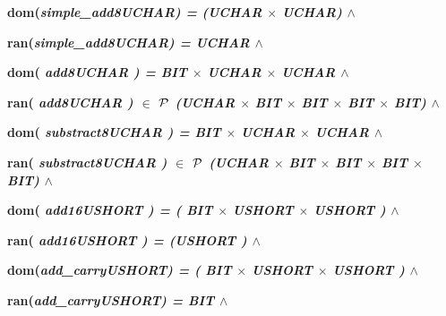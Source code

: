 \documentclass[11pt]{article}
\begin{document}
\begin{sloppypar}
\hspace*{0.20in}\bf dom\rm (\it simple\_add8UCHAR\rm ) \rm = \rm (\it UCHAR  $\times$  \it UCHAR\rm )  $\land$ 

\hspace*{0.20in}\bf ran\rm (\it simple\_add8UCHAR\rm ) \rm = \it UCHAR  $\land$ 

\hspace*{0.20in}

\hspace*{0.20in}

\hspace*{0.20in}\bf dom\rm ( \it add8UCHAR \rm ) \rm = \it BIT  $\times$  \it UCHAR  $\times$  \it UCHAR  $\land$ 

\hspace*{0.20in}\bf ran\rm ( \it add8UCHAR \rm )  $\in$   $\mbox{${\cal P}$}$ \rm (\it UCHAR  $\times$  \it BIT  $\times$  \it BIT  $\times$  \it BIT  $\times$  \it BIT\rm )  $\land$ 

\hspace*{0.20in}

\hspace*{0.20in}\bf dom\rm ( \it substract8UCHAR \rm ) \rm = \it BIT $\times$ \it UCHAR  $\times$  \it UCHAR  $\land$ 

\hspace*{0.20in}\bf ran\rm ( \it substract8UCHAR \rm )  $\in$   $\mbox{${\cal P}$}$ \rm (\it UCHAR  $\times$  \it BIT  $\times$  \it BIT  $\times$  \it BIT  $\times$  \it BIT\rm )\hspace*{0.10in} $\land$ 

\hspace*{0.20in}

\hspace*{0.20in}

\hspace*{0.20in}\bf dom\rm ( \it add16USHORT \rm ) \rm = \rm ( \it BIT  $\times$  \it USHORT  $\times$  \it USHORT \rm )  $\land$ 

\hspace*{0.20in}\bf ran\rm ( \it add16USHORT \rm ) \rm = \rm (\it USHORT \rm )\hspace*{0.10in} $\land$ 

\hspace*{0.20in}

\hspace*{0.20in}\bf dom\rm (\it add\_carryUSHORT\rm ) \rm = \rm ( \it BIT  $\times$  \it USHORT  $\times$  \it USHORT \rm )  $\land$ 

\hspace*{0.20in}\bf ran\rm (\it add\_carryUSHORT\rm ) \rm = \it BIT  $\land$ 


\end{sloppypar}
\end{document}
